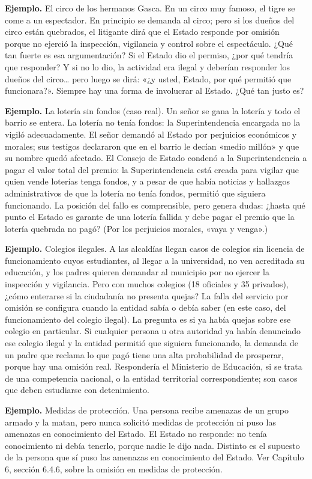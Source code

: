 \begin{ejemplo}
\textcolor[HTML]{4F6228}{\textbf{Ejemplo. }}El circo de los hermanos Gasca. En un circo muy famoso, el tigre se come a un espectador. En principio se demanda al circo; pero si los dueños del circo están quebrados, el litigante dirá que el Estado responde por omisión porque no ejerció la inspección, vigilancia y control sobre el espectáculo. ¿Qué tan fuerte es esa argumentación? Si el Estado dio el permiso, ¿por qué tendría que responder? Y si no lo dio, la actividad era ilegal y deberían responder los dueños del circo… pero luego se dirá: «¿y usted, Estado, por qué permitió que funcionara?». Siempre hay una forma de involucrar al Estado. ¿Qué tan justo es?
\par
\textcolor[HTML]{4F6228}{\textbf{Ejemplo. }}La lotería sin fondos (caso real). Un señor se gana la lotería y todo el barrio se entera. La lotería no tenía fondos: la Superintendencia encargada no la vigiló adecuadamente. El señor demandó al Estado por perjuicios económicos y morales; sus testigos declararon que en el barrio le decían «medio millón» y que su nombre quedó afectado. El Consejo de Estado condenó a la Superintendencia a pagar el valor total del premio: la Superintendencia está creada para vigilar que quien vende loterías tenga fondos, y a pesar de que había noticias y hallazgos administrativos de que la lotería no tenía fondos, permitió que siguiera funcionando. La posición del fallo es comprensible, pero genera dudas: ¿hasta qué punto el Estado es garante de una lotería fallida y debe pagar el premio que la lotería quebrada no pagó? (Por los perjuicios morales, «vaya y venga».)
\par
\textcolor[HTML]{4F6228}{\textbf{Ejemplo. }}Colegios ilegales. A las alcaldías llegan casos de colegios sin licencia de funcionamiento cuyos estudiantes, al llegar a la universidad, no ven acreditada su educación, y los padres quieren demandar al municipio por no ejercer la inspección y vigilancia. Pero con muchos colegios (18 oficiales y 35 privados), ¿cómo enterarse si la ciudadanía no presenta quejas? La falla del servicio por omisión se configura cuando la entidad sabía o debía saber (en este caso, del funcionamiento del colegio ilegal). La pregunta es si ya había quejas sobre ese colegio en particular. Si cualquier persona u otra autoridad ya había denunciado ese colegio ilegal y la entidad permitió que siguiera funcionando, la demanda de un padre que reclama lo que pagó tiene una alta probabilidad de prosperar, porque hay una omisión real. Respondería el Ministerio de Educación, si se trata de una competencia nacional, o la entidad territorial correspondiente; son casos que deben estudiarse con detenimiento.
\par
\textcolor[HTML]{4F6228}{\textbf{Ejemplo. }}Medidas de protección. Una persona recibe amenazas de un grupo armado y la matan, pero nunca solicitó medidas de protección ni puso las amenazas en conocimiento del Estado. El Estado no responde: no tenía conocimiento ni debía tenerlo, porque nadie le dijo nada. Distinto es el supuesto de la persona que sí puso las amenazas en conocimiento del Estado. Ver Capítulo 6, sección 6.4.6, sobre la omisión en medidas de protección.
\end{ejemplo}
